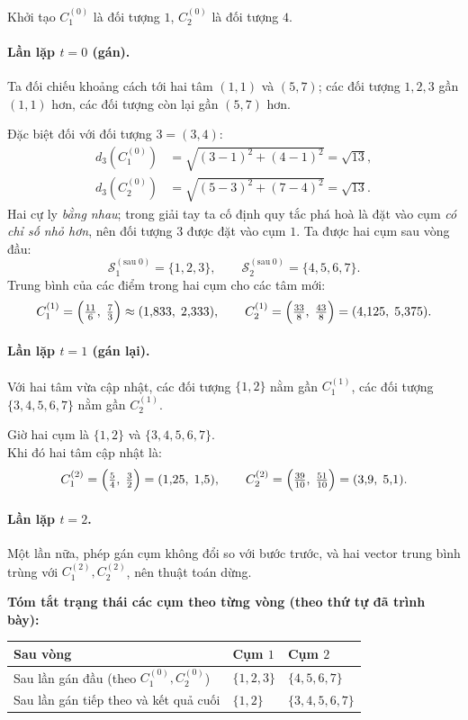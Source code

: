 Khởi tạo $C_1^{(0)}$ là đối tượng $1$, $C_2^{(0)}$ là đối tượng $4$.

\paragraph{Lần lặp $t=0$ (gán).}
Ta đối chiếu khoảng cách tới hai tâm $(1,1)$ và $(5,7)$; các đối tượng $1,2,3$ gần $(1,1)$ hơn, các đối tượng còn lại gần $(5,7)$ hơn.

Đặc biệt đối với đối tượng $3=(3,4)$:
\begin{align*}
d_3(C_1^{(0)}) &= \sqrt{(3-1)^2+(4-1)^2}=\sqrt{13},\\
d_3(C_2^{(0)}) &= \sqrt{(5-3)^2+(7-4)^2}=\sqrt{13}.
\end{align*}
Hai cự ly \emph{bằng nhau}; trong giải tay ta cố định quy tắc phá hoà là đặt vào cụm \emph{có chỉ số nhỏ hơn}, nên đối tượng $3$ được đặt vào cụm $1$.
Ta được hai cụm sau vòng đầu:
\[
\mathcal{S}_1^{(\mathrm{sau}\;0)}=\{1,2,3\},\qquad
\mathcal{S}_2^{(\mathrm{sau}\;0)}=\{4,5,6,7\}.
\]
Trung bình của các điểm trong hai cụm cho các tâm mới:
\[
C_1^{(1)}=\Bigl(\tfrac{11}{6},\;\tfrac{7}{3}\Bigr)\approx(1{,}833,\;2{,}333),\qquad
C_2^{(1)}=\Bigl(\tfrac{33}{8},\;\tfrac{43}{8}\Bigr)=(4{,}125,\;5{,}375).
\]

\paragraph{Lần lặp $t=1$ (gán lại).}
Với hai tâm vừa cập nhật, các đối tượng $\{1,2\}$ nằm gần $C_1^{(1)}$, các đối tượng $\{3,4,5,6,7\}$ nằm gần $C_2^{(1)}$.

Giờ hai cụm là $\{1,2\}$ và $\{3,4,5,6,7\}$.\\
Khi đó hai tâm cập nhật là:
\[
C_1^{(2)}=\Bigl(\tfrac54,\;\tfrac32\Bigr)=(1{,}25,\;1{,}5),\qquad
C_2^{(2)}=\Bigl(\tfrac{39}{10},\;\tfrac{51}{10}\Bigr)=(3{,}9,\;5{,}1).
\]

\paragraph{Lần lặp $t=2$.}
Một lần nữa, phép gán cụm không đổi so với bước trước, và hai vector trung bình trùng với $C_1^{(2)},C_2^{(2)}$, nên thuật toán dừng.

\textbf{Tóm tắt trạng thái các cụm theo từng vòng (theo thứ tự đã trình bày):}
\begin{center}
\begin{tabular}{@{}lll@{}}
\toprule
Sau vòng & Cụm $1$ & Cụm $2$ \\
\midrule
Sau lần gán đầu (theo $C_1^{(0)},C_2^{(0)}$) & $\{1,2,3\}$ & $\{4,5,6,7\}$ \\
Sau lần gán tiếp theo và kết quả cuối & $\{1,2\}$ & $\{3,4,5,6,7\}$ \\
\bottomrule
\end{tabular}
\end{center}


